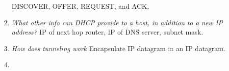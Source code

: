 \documentclass{article}
\begin{document}
\begin{enumerate}[label=\textit{(\roman*)}]
        DISCOVER, OFFER, REQUEST, and ACK.
    \item \textit{What other info can DHCP provide to a host, in addition to a new IP address?}
        \newline
        \newline
        IP of next hop router, IP of DNS server, subnet mask.
    \item \textit{How does tunneling work}
        \newline
        \newline
        Encapsulate IP datagram in an IP datagram.
    \item 




\end{enumerate}
\end{document}
